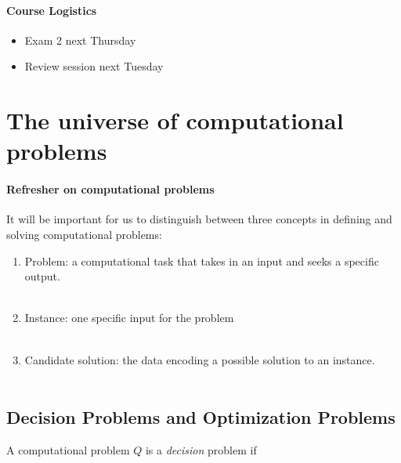 \documentclass[11  pt]{article}
\begin{document}
	
	\paragraph{Course Logistics}
	\begin{itemize}
		\item Exam 2 next Thursday
		\item Review session next Tuesday
		\end{itemize}
	
	
	
	\section{The universe of computational problems}
	\vspace{5cm}
	

	
	\paragraph{Refresher on computational problems}
	It will be important for us to distinguish between three concepts in defining and solving computational problems:
	\begin{enumerate}
		\item Problem: a computational task that takes in an input and seeks a specific output. \\ \\
		\item Instance:  one specific input for the problem \\ \\
		\item Candidate solution: the data encoding a possible solution to an instance. \\ \\
	\end{enumerate}

	\newpage
	
	\subsection{Decision Problems and Optimization Problems}
	A computational problem $Q$ is a \emph{decision} problem if \\%
	
	
	\vfill
	
\end{document}
